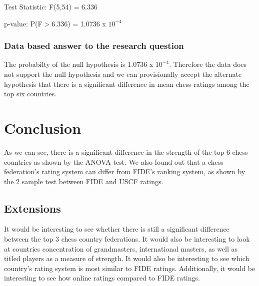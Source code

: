 \documentclass[12pt, titlepage]{article}
\begin{document}
Test Statistic: F(5,54) = 6.336

p-value: P(F\(>\)6.336) = 1.0736 x \(10^{-4}\)

\subsubsection{Data based answer to the research question}
The probabilty of the null hypothesis is 1.0736 x \(10^{-4}\). Therefore the data does not support the null hypothesis and we can provisionally accept the alternate hypothesis that there is a significant difference in mean chess ratings among the top six countries.

\section{Conclusion}
As we can see, there is a significant difference in the strength of the top 6 chess countries as shown by the ANOVA test. We also found out that a chess federation's rating system can differ from FIDE's ranking system, as shown by the 2 sample test between FIDE and USCF ratings. 

\subsection{Extensions}
It would be interesting to see whether there is still a significant difference between the top 3 chess country federations. It would also be interesting to look at countries concentration of grandmasters, international masters, as well as titled players as a measure of strength. It would also be interesting to see which country's rating system is most similar to FIDE ratings. Additionally, it would be interesting to see how online ratings compared to FIDE ratings.




\end{document}
